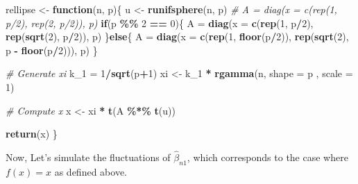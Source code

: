 \documentclass[
]{article}
\newenvironment{Shaded}{\begin{snugshade}}{\end{snugshade}}
\newcommand{\AttributeTok}[1]{\textcolor[rgb]{0.13,0.29,0.53}{#1}}
\newcommand{\CommentTok}[1]{\textcolor[rgb]{0.56,0.35,0.01}{\textit{#1}}}
\newcommand{\ControlFlowTok}[1]{\textcolor[rgb]{0.13,0.29,0.53}{\textbf{#1}}}
\newcommand{\DecValTok}[1]{\textcolor[rgb]{0.00,0.00,0.81}{#1}}
\newcommand{\FunctionTok}[1]{\textcolor[rgb]{0.13,0.29,0.53}{\textbf{#1}}}
\newcommand{\NormalTok}[1]{#1}
\newcommand{\OtherTok}[1]{\textcolor[rgb]{0.56,0.35,0.01}{#1}}
\newcommand{\SpecialCharTok}[1]{\textcolor[rgb]{0.81,0.36,0.00}{\textbf{#1}}}
\begin{document}
\begin{Shaded}
\begin{Highlighting}[]
\NormalTok{rellipse }\OtherTok{\textless{}{-}} \ControlFlowTok{function}\NormalTok{(n, p)\{}
\NormalTok{  u }\OtherTok{\textless{}{-}} \FunctionTok{runifsphere}\NormalTok{(n, p)}
  \CommentTok{\# A = diag(x = c(rep(1, p/2), rep(2, p/2)), p)}
  \ControlFlowTok{if}\NormalTok{(p }\SpecialCharTok{\%\%} \DecValTok{2} \SpecialCharTok{==} \DecValTok{0}\NormalTok{)\{}
\NormalTok{    A }\OtherTok{=} \FunctionTok{diag}\NormalTok{(}\AttributeTok{x =} \FunctionTok{c}\NormalTok{(}\FunctionTok{rep}\NormalTok{(}\DecValTok{1}\NormalTok{, p}\SpecialCharTok{/}\DecValTok{2}\NormalTok{), }\FunctionTok{rep}\NormalTok{(}\FunctionTok{sqrt}\NormalTok{(}\DecValTok{2}\NormalTok{), p}\SpecialCharTok{/}\DecValTok{2}\NormalTok{)), p)}
\NormalTok{  \}}\ControlFlowTok{else}\NormalTok{\{}
\NormalTok{    A }\OtherTok{=} \FunctionTok{diag}\NormalTok{(}\AttributeTok{x =} \FunctionTok{c}\NormalTok{(}\FunctionTok{rep}\NormalTok{(}\DecValTok{1}\NormalTok{, }\FunctionTok{floor}\NormalTok{(p}\SpecialCharTok{/}\DecValTok{2}\NormalTok{)), }\FunctionTok{rep}\NormalTok{(}\FunctionTok{sqrt}\NormalTok{(}\DecValTok{2}\NormalTok{), p }\SpecialCharTok{{-}} \FunctionTok{floor}\NormalTok{(p}\SpecialCharTok{/}\DecValTok{2}\NormalTok{))), p)}
\NormalTok{  \}}
  
  \CommentTok{\# Generate xi}
\NormalTok{  k\_1 }\OtherTok{=} \DecValTok{1}\SpecialCharTok{/}\FunctionTok{sqrt}\NormalTok{(p}\SpecialCharTok{+}\DecValTok{1}\NormalTok{)}
\NormalTok{  xi }\OtherTok{\textless{}{-}}\NormalTok{ k\_1 }\SpecialCharTok{*} \FunctionTok{rgamma}\NormalTok{(n, }\AttributeTok{shape =}\NormalTok{ p , }\AttributeTok{scale =} \DecValTok{1}\NormalTok{)}

  \CommentTok{\# Compute x}
\NormalTok{  x }\OtherTok{\textless{}{-}}\NormalTok{ xi }\SpecialCharTok{*} \FunctionTok{t}\NormalTok{(A }\SpecialCharTok{\%*\%} \FunctionTok{t}\NormalTok{(u))}
  
  \FunctionTok{return}\NormalTok{(x)}
\NormalTok{\}}
\end{Highlighting}
\end{Shaded}

Now, Let's simulate the fluctuations of \(\hat\beta_{n1}\), which
corresponds to the case where \(f(x) = x\) as defined above.
\end{document}
